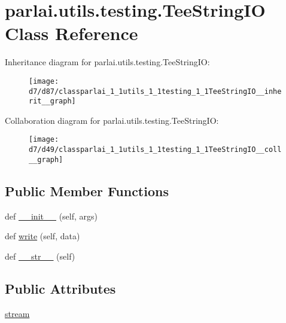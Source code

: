 \hypertarget{classparlai_1_1utils_1_1testing_1_1TeeStringIO}{}\section{parlai.\+utils.\+testing.\+Tee\+String\+IO Class Reference}
\label{classparlai_1_1utils_1_1testing_1_1TeeStringIO}


Inheritance diagram for parlai.\+utils.\+testing.\+Tee\+String\+IO\+:
\nopagebreak
\begin{figure}[H]
\begin{center}
\leavevmode
\texttt{[image: d7/d87/classparlai\_1\_1utils\_1\_1testing\_1\_1TeeStringIO\_\_inherit\_\_graph]}
\end{center}
\end{figure}


Collaboration diagram for parlai.\+utils.\+testing.\+Tee\+String\+IO\+:
\nopagebreak
\begin{figure}[H]
\begin{center}
\leavevmode
\texttt{[image: d7/d49/classparlai\_1\_1utils\_1\_1testing\_1\_1TeeStringIO\_\_coll\_\_graph]}
\end{center}
\end{figure}
\subsection*{Public Member Functions}
\begin{DoxyCompactItemize}
\item 
def \hyperlink{classparlai_1_1utils_1_1testing_1_1TeeStringIO_a594bf609cf952ab21c412a4c520235d4}{\+\_\+\+\_\+init\+\_\+\+\_\+} (self, args)
\item 
def \hyperlink{classparlai_1_1utils_1_1testing_1_1TeeStringIO_af8c256be884cbcb0081768bc04738015}{write} (self, data)
\item 
def \hyperlink{classparlai_1_1utils_1_1testing_1_1TeeStringIO_a92670e92c021328191f396d1d4bb1759}{\+\_\+\+\_\+str\+\_\+\+\_\+} (self)
\end{DoxyCompactItemize}
\subsection*{Public Attributes}
\begin{DoxyCompactItemize}
\item 
\hyperlink{classparlai_1_1utils_1_1testing_1_1TeeStringIO_a4dc6e50f503b4679fe3b3fa0ebd729f1}{stream}
\end{DoxyCompactItemize}


